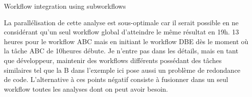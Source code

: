 {\begin{frame}{Workflow integration using subworkflows}
{    La parallélisation de cette analyse est sous-optimale car il serait possible en ne considérant qu'un seul workflow global d'atteindre le même résultat en 19h. 13 heures pour le workflow ABC mais en initiant le workflow DBE dès le moment où la tâche ABC de 10heures débute. Je n'entre pas dans les détails, mais en tant que développeur, maintenir des workflows différents possédant des tâches similaires tel que la B dans l'exemple ici pose aussi un problème de redondance de code. L'alternative à ces points négatif consiste à fusionner dans un seul workflow toutes les analyses dont on peut avoir besoin.
    
    }
  \end{frame}
  }
